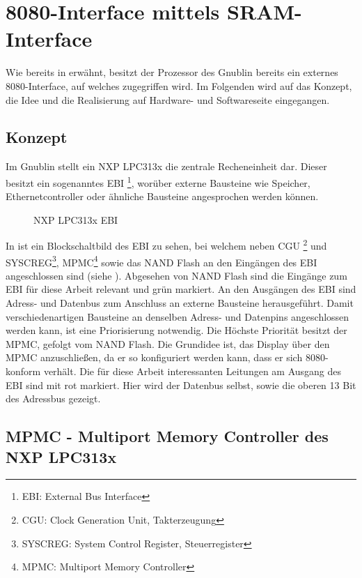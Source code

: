 \section{8080-Interface mittels SRAM-Interface}
\label{sec:TeilA_8080SRAM}
Wie bereits in  erwähnt, besitzt der Prozessor des Gnublin bereits ein externes 8080-Interface, auf welches zugegriffen wird. Im Folgenden wird auf das Konzept, die Idee und die Realisierung auf Hardware- und Softwareseite eingegangen.
\newpage
\subsection{Konzept}
\label{cha:teila_konzept}
Im Gnublin stellt ein NXP LPC313x die zentrale Recheneinheit dar. Dieser besitzt ein sogenanntes EBI \footnote{EBI: External Bus Interface}, worüber externe Bausteine wie Speicher, Ethernetcontroller oder ähnliche Bausteine angesprochen werden können.

\begin{figure}[htp]
	\centering
{}
	\caption{NXP LPC313x EBI}
	\label{fig:lpc_ebi}
\end{figure}

In  ist ein Blockschaltbild des EBI zu sehen, bei welchem neben CGU \footnote{CGU: Clock Generation Unit, Takterzeugung} und SYSCREG\footnote{SYSCREG: System Control Register, Steuerregister}, MPMC\footnote{MPMC: Multiport Memory Controller} sowie das NAND Flash an den Eingängen des EBI angeschlossen sind (siehe \cite{NXP2010}). Abgesehen von NAND Flash sind die Eingänge zum EBI für diese Arbeit relevant und grün markiert. An den Ausgängen des EBI sind Adress- und Datenbus zum Anschluss an externe Bausteine herausgeführt. Damit verschiedenartigen Bausteine an denselben Adress- und Datenpins angeschlossen werden kann, ist eine Priorisierung notwendig. Die Höchste Priorität besitzt der MPMC, gefolgt vom NAND Flash. 
Die Grundidee ist, das Display über den MPMC anzuschließen, da er so konfiguriert werden kann, dass er sich 8080-konform verhält. Die für diese Arbeit interessanten Leitungen am Ausgang des EBI sind mit rot markiert. Hier wird der Datenbus selbst, sowie die oberen 13 Bit des Adressbus gezeigt.


\subsection{MPMC - Multiport Memory Controller des NXP LPC313x}
\label{cha:mpmc}

